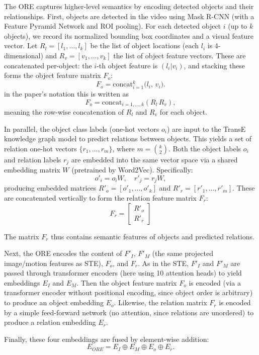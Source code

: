 The ORE captures higher-level semantics by encoding detected objects and their relationships. First, objects are detected in the video using Mask R-CNN (with a Feature Pyramid Network and ROI pooling). For each detected object $i$ (up to $k$ objects), we record its normalized bounding box coordinates and a visual feature vector. Let $R_l=[l_1,\dots,l_k]$ be the list of object locations (each $l_i$ is 4-dimensional) and $R_v=[v_1,\dots,v_k]$ the list of object feature vectors. These are concatenated per-object: the $i$-th object feature is $(l_i|v_i)$, and stacking these forms the object feature matrix $F_o$:
$$
F_o = \mathrm{concat}_{i=1}^k\bigl(l_i,\,v_i\bigr).
$$
in the paper's notation this is written as
$$
F_o = \mathrm{concat}_{i=1,\dots,k}(R_l\,R_v),
$$
meaning the row-wise concatenation of $R_l$ and $R_v$ for each object.

In parallel, the object class labels (one-hot vectors $o_i$) are input to the TransE knowledge graph model to predict relations between objects. This yields a set of relation one-hot vectors $\{r_1,\dots,r_{m}\}$, where $m=\binom{k}{2}$. Both the object labels $o_i$ and relation labels $r_j$ are embedded into the same vector space via a shared embedding matrix $W$ (pretrained by Word2Vec). Specifically:
$$
o'_i = o_i W,\quad r'_j = r_j W,
$$
producing embedded matrices $R'_o=[o'_1,\dots,o'_k]$ and $R'_r=[r'_1,\dots,r'_m]$. These are concatenated vertically to form the relation feature matrix $F_r$:
$$
F_r = \begin{bmatrix}R'_o \\ R'_r\end{bmatrix}
$$

The matrix $F_r$ thus contains semantic features of objects and predicted relations.

Next, the ORE encodes the content of $F'_I$, $F'_M$ (the same projected image/motion features as STE), $F_o$, and $F_r$. As in the STE, $F'_I$ and $F'_M$ are passed through transformer encoders (here using 10 attention heads) to yield embeddings $E_I$ and $E_M$. Then the object feature matrix $F_o$ is encoded (via a transformer encoder without positional encoding, since object order is arbitrary) to produce an object embedding $E_o$. Likewise, the relation matrix $F_r$ is encoded by a simple feed-forward network (no attention, since relations are unordered) to produce a relation embedding $E_r$.

Finally, these four embeddings are fused by element-wise addition:
$$
E_{ORE} = E_I \oplus E_M \oplus E_o \oplus E_r.
$$

